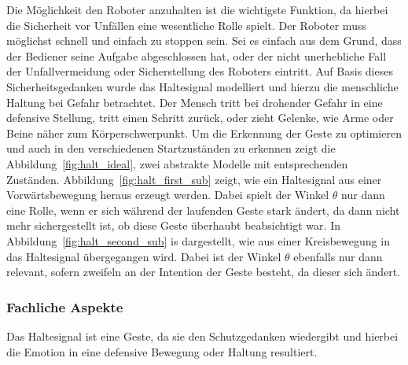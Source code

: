 Die M\"oglichkeit den Roboter anzuhalten ist die wichtigste Funktion, da hierbei die Sicherheit vor Unf\"allen eine wesentliche Rolle spielt. Der Roboter muss m\"oglichst schnell und einfach zu stoppen sein. Sei es einfach aus dem Grund, dass der Bediener seine Aufgabe abgeschlossen hat, oder der nicht unerhebliche Fall der Unfallvermeidung oder Sicherstellung des Roboters eintritt.
\newline
Auf Basis dieses Sicherheitsgedanken wurde das Haltesignal modelliert und hierzu die menschliche Haltung bei Gefahr betrachtet. Der Mensch tritt bei drohender Gefahr in eine defensive Stellung, tritt einen Schritt zur\"uck, oder zieht Gelenke, wie Arme oder Beine n\"aher zum K\"orperschwerpunkt.
\newline
Um die Erkennung der Geste zu optimieren und auch in den verschiedenen Startzust\"anden zu erkennen zeigt die Abbildung~\ref{fig:halt_ideal}, zwei abstrakte Modelle mit entsprechenden Zust\"anden. 
\newline
Abbildung~\ref{fig:halt_first_sub} zeigt, wie ein Haltesignal aus einer Vorw\"artsbewegung heraus erzeugt werden. Dabei spielt der Winkel $\theta$ nur dann eine Rolle, wenn er sich w\"ahrend der laufenden Geste stark \"andert, da dann nicht mehr sichergestellt ist, ob diese Geste \"uberhaubt beabsichtigt war.
\newline
In Abbildung~\ref{fig:halt_second_sub} is dargestellt, wie aus einer Kreisbewegung in das Haltesignal \"ubergegangen wird. Dabei ist der Winkel $\theta$ ebenfalls nur dann relevant, sofern zweifeln an der Intention der Geste besteht, da dieser sich \"andert.

\subsubsection{Fachliche Aspekte}
Das Haltesignal ist eine  Geste, da sie den Schutzgedanken wiedergibt und hierbei die Emotion in eine defensive Bewegung oder Haltung resultiert. 

